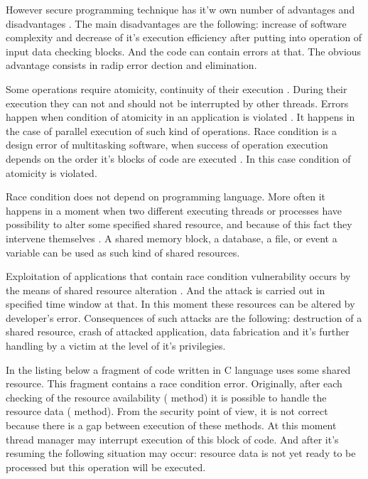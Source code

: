%
However secure programming technique has it'w own number of advantages and disadvantages . 
%
The main disadvantages are the following: increase of software complexity and decrease of it's execution efficiency after putting into operation of input data checking blocks. 
%
And the code can contain errors at that. 
%
The obvious advantage consists in radip error dection and elimination. 



%
Some operations require atomicity, continuity of their execution . 
%
During their execution they can not and should not be interrupted by other threads. 
%
Errors happen when condition of atomicity in an application is violated . 
%
It happens in the case of parallel execution of such kind of operations. 
%
Race condition is a design error of multitasking software, when success of operation execution depends on the order it's blocks of code are executed . 
%
In this case condition of atomicity is violated. 

%
Race condition does not depend on programming language. 
%
More often it happens in a moment when two different executing threads or processes have possibility to alter some specified shared resource, and because of this fact they intervene themselves  . 
%
A shared memory block, a database, a file, or event a variable can be used as such kind of shared resources. 

%
Exploitation of applications that contain race condition vulnerability occurs by the means of shared resource alteration . 
%
And the attack is carried out in specified time window at that. 
%
In this moment these resources can be altered by developer's error. 
%
Consequences of such attacks are the following: destruction of a shared resource, crash of attacked application, data fabrication and it's further handling by a victim at the level of it's privilegies. 

%
In the listing below a fragment of code written in C language uses some shared resource. 
%
This fragment contains a race condition error. 
%
Originally, after each checking of the resource availability ( method) it is possible to handle the resource data ( method). 
%
From the security point of view, it is not correct because there is a gap between execution of these methods. 
%
At this moment thread manager may interrupt execution of this block of code. 
%
And after it's resuming the following situation may occur: resource data is not yet ready to be processed but this operation will be executed. 

